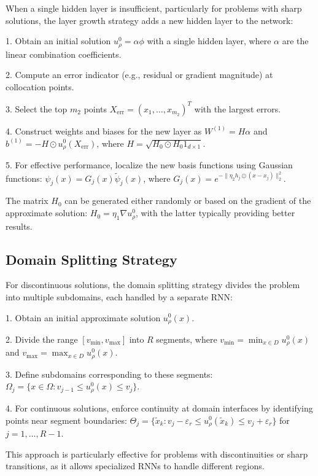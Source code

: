\documentclass[11pt,a4paper]{article}
\begin{document}
When a single hidden layer is insufficient, particularly for problems with sharp solutions, the layer growth strategy adds a new hidden layer to the network:

1. Obtain an initial solution $u^0_\rho = \alpha\phi$ with a single hidden layer, where $\alpha$ are the linear combination coefficients.

2. Compute an error indicator (e.g., residual or gradient magnitude) at collocation points.

3. Select the top $m_2$ points $X_{\text{err}} = (x_1,\ldots,x_{m_2})^T$ with the largest errors.

4. Construct weights and biases for the new layer as $W^{(1)} = H\alpha$ and $b^{(1)} = -H \odot u^0_\rho(X_{\text{err}})$, where $H = \sqrt{H_0 \odot H_0 1_{d\times 1}}$.

5. For effective performance, localize the new basis functions using Gaussian functions:
   $\psi_j(x) = G_j(x)\tilde{\psi}_j(x)$, where $G_j(x) = e^{-\|\eta_2 h_j \odot (x-x_j)\|^2_2}$.

The matrix $H_0$ can be generated either randomly or based on the gradient of the approximate solution: $H_0 = \eta_1 \nabla u^0_\rho$, with the latter typically providing better results.

\subsection{Domain Splitting Strategy}

For discontinuous solutions, the domain splitting strategy divides the problem into multiple subdomains, each handled by a separate RNN:

1. Obtain an initial approximate solution $u^0_\rho(x)$.

2. Divide the range $[v_{\min}, v_{\max}]$ into $R$ segments, where $v_{\min} = \min_{x \in D} u^0_\rho(x)$ and $v_{\max} = \max_{x \in D} u^0_\rho(x)$.

3. Define subdomains corresponding to these segments: $\Omega_j = \{x \in \Omega : v_{j-1} \leq u^0_\rho(x) \leq v_j\}$.

4. For continuous solutions, enforce continuity at domain interfaces by identifying points near segment boundaries:
   $\Theta_j = \{\tilde{x}_k : v_j-\varepsilon_r \leq u^0_\rho(\tilde{x}_k) \leq v_j+\varepsilon_r\}$ for $j = 1,\ldots,R-1$.

This approach is particularly effective for problems with discontinuities or sharp transitions, as it allows specialized RNNs to handle different regions.
\end{document}
